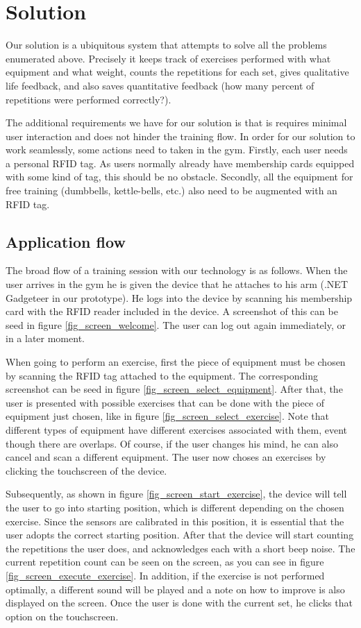 \documentclass{tk3-team}
\begin{document}
\section{Solution}

Our solution is a ubiquitous system that attempts to solve all the problems enumerated above. Precisely it keeps track of exercises performed with what equipment and what weight, counts the repetitions for each set, gives qualitative life feedback, and also saves quantitative feedback (how many percent of repetitions were performed correctly?).

The additional requirements we have for our solution is that is requires minimal user interaction and does not hinder the training flow. In order for our solution to work seamlessly, some actions need to taken in the gym. Firstly, each user needs a personal RFID tag. As users normally already have membership cards equipped with some kind of tag, this should be no obstacle. Secondly, all the equipment for free training (dumbbells, kettle-bells, etc.) also need to be augmented with an RFID tag.

\subsection{Application flow}
The broad flow of a training session with our technology is as follows. When the user arrives in the gym he is given the device that he attaches to his arm (.NET Gadgeteer in our prototype). He logs into the device by scanning his membership card with the RFID reader included in the device. A screenshot of this can be seed in figure \ref{fig_screen_welcome}. The user can log out again immediately, or in a later moment.

When going to perform an exercise, first the piece of equipment must be chosen by scanning the RFID tag attached to the equipment. The corresponding screenshot can be seed in figure \ref{fig_screen_select_equipment}. After that, the user is presented with possible exercises that can be done with the piece of equipment just chosen, like in figure \ref{fig_screen_select_exercise}. Note that different types of equipment have different exercises associated with them, event though there are overlaps. Of course, if the user changes his mind, he can also cancel and scan a different equipment. The user now choses an exercises by clicking the touchscreen of the device.

Subsequently, as shown in figure \ref{fig_screen_start_exercise}, the device will tell the user to go into starting position, which is different depending on the chosen exercise. Since the sensors are calibrated in this position, it is essential that the user adopts the correct starting position. After that the device will start counting the repetitions the user does, and acknowledges each with a short beep noise. The current repetition count can be seen on the screen, as you can see in figure \ref{fig_screen_execute_exercise}. In addition, if the exercise is not performed optimally, a different sound will be played and a note on how to improve is also displayed on the screen. Once the user is done with the current set, he clicks that option on the touchscreen.
\end{document}
